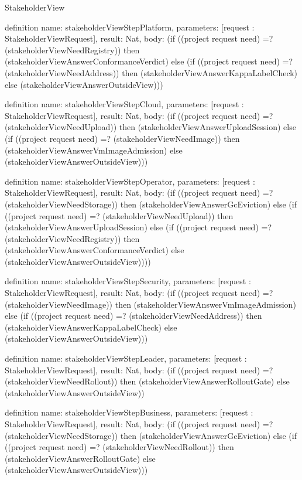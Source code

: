 \begin{lexlean}{StakeholderView}
\begin{semanticmodule}
definition{
  name: stakeholderViewStepPlatform,
  parameters: [request : StakeholderViewRequest],
  result: Nat,
  body: (if ((project request need) =? (stakeholderViewNeedRegistry)) then (stakeholderViewAnswerConformanceVerdict) else (if ((project request need) =? (stakeholderViewNeedAddress)) then (stakeholderViewAnswerKappaLabelCheck) else (stakeholderViewAnswerOutsideView)))
}

definition{
  name: stakeholderViewStepCloud,
  parameters: [request : StakeholderViewRequest],
  result: Nat,
  body: (if ((project request need) =? (stakeholderViewNeedUpload)) then (stakeholderViewAnswerUploadSession) else (if ((project request need) =? (stakeholderViewNeedImage)) then (stakeholderViewAnswerVmImageAdmission) else (stakeholderViewAnswerOutsideView)))
}

definition{
  name: stakeholderViewStepOperator,
  parameters: [request : StakeholderViewRequest],
  result: Nat,
  body: (if ((project request need) =? (stakeholderViewNeedStorage)) then (stakeholderViewAnswerGcEviction) else (if ((project request need) =? (stakeholderViewNeedUpload)) then (stakeholderViewAnswerUploadSession) else (if ((project request need) =? (stakeholderViewNeedRegistry)) then (stakeholderViewAnswerConformanceVerdict) else (stakeholderViewAnswerOutsideView))))
}

definition{
  name: stakeholderViewStepSecurity,
  parameters: [request : StakeholderViewRequest],
  result: Nat,
  body: (if ((project request need) =? (stakeholderViewNeedImage)) then (stakeholderViewAnswerVmImageAdmission) else (if ((project request need) =? (stakeholderViewNeedAddress)) then (stakeholderViewAnswerKappaLabelCheck) else (stakeholderViewAnswerOutsideView)))
}

definition{
  name: stakeholderViewStepLeader,
  parameters: [request : StakeholderViewRequest],
  result: Nat,
  body: (if ((project request need) =? (stakeholderViewNeedRollout)) then (stakeholderViewAnswerRolloutGate) else (stakeholderViewAnswerOutsideView))
}

definition{
  name: stakeholderViewStepBusiness,
  parameters: [request : StakeholderViewRequest],
  result: Nat,
  body: (if ((project request need) =? (stakeholderViewNeedStorage)) then (stakeholderViewAnswerGcEviction) else (if ((project request need) =? (stakeholderViewNeedRollout)) then (stakeholderViewAnswerRolloutGate) else (stakeholderViewAnswerOutsideView)))
}


\end{semanticmodule}
\end{lexlean}
